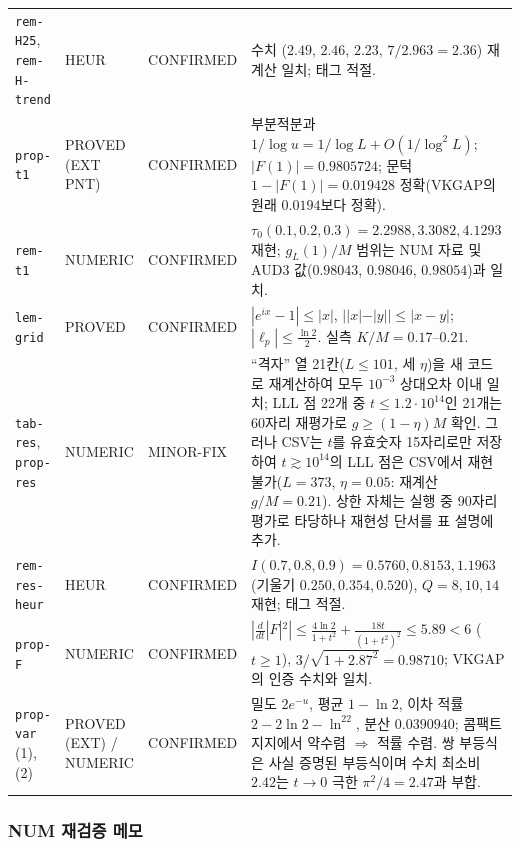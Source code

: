 \begin{center}
\begin{longtable}{p{}p{}p{}p{}}
\texttt{rem-H25}, \texttt{rem-H-trend} & HEUR & CONFIRMED & 수치 ($2.49$, $2.46$, $2.23$, $7/2.963=2.36$) 재계산 일치; 태그 적절.\\
\texttt{prop-t1} & PROVED (EXT PNT) & CONFIRMED & 부분적분과 $1/\log u=1/\log L+O(1/\log^2L)$; $|F(1)|=0.9805724$; 문턱 $1-|F(1)|=0.019428$ 정확(VKGAP의 원래 $0.0194$보다 정확).\\
\texttt{rem-t1} & NUMERIC & CONFIRMED & $\tau_0(0.1,0.2,0.3)=2.2988,3.3082,4.1293$ 재현; $g_L(1)/M$ 범위는 NUM 자료 및 AUD3 값($0.98043$, $0.98046$, $0.98054$)과 일치.\\
\texttt{lem-grid} & PROVED & CONFIRMED & $|e^{ix}-1|\le|x|$, $||x|-|y||\le|x-y|$; $|\ell_p|\le\frac{\ln2}2$. 실측 $K/M=0.17$--$0.21$.\\
\texttt{tab-res}, \texttt{prop-res} & NUMERIC & MINOR-FIX & ``격자'' 열 21칸($L\le101$, 세 $\eta$)을 새 코드로 재계산하여 모두 $10^{-3}$ 상대오차 이내 일치; LLL 점 22개 중 $t\le1.2\cdot10^{14}$인 21개는 60자리 재평가로 $g\ge(1-\eta)M$ 확인. 그러나 CSV는 $t$를 유효숫자 15자리로만 저장하여 $t\gtrsim10^{14}$의 LLL 점은 CSV에서 재현 불가($L=373$, $\eta=0.05$: 재계산 $g/M=0.21$). 상한 자체는 실행 중 90자리 평가로 타당하나 재현성 단서를 표 설명에 추가.\\
\texttt{rem-res-heur} & HEUR & CONFIRMED & $I(0.7,0.8,0.9)=0.5760,0.8153,1.1963$ (기울기 $0.250,0.354,0.520$), $Q=8,10,14$ 재현; 태그 적절.\\
\texttt{prop-F} & NUMERIC & CONFIRMED & $|\frac{d}{dt}|F|^2|\le\frac{4\ln2}{1+t^2}+\frac{18t}{(1+t^2)^2}\le5.89<6$ ($t\ge1$), $3/\sqrt{1+2.87^2}=0.98710$; VKGAP의 인증 수치와 일치.\\
\texttt{prop-var} (1),(2) & PROVED (EXT) / NUMERIC & CONFIRMED & 밀도 $2e^{-u}$, 평균 $1-\ln2$, 이차 적률 $2-2\ln2-\ln^22$, 분산 $0.0390940$; 콤팩트 지지에서 약수렴 $\Rightarrow$ 적률 수렴. 쌍 부등식은 사실 증명된 부등식이며 수치 최소비 $2.42$는 $t\to0$ 극한 $\pi^2/4=2.47$과 부합.\\
\bottomrule
\end{longtable}
\end{center}

\subsubsection{NUM 재검증 메모}\label{AUD3:ssec-num-notes}

